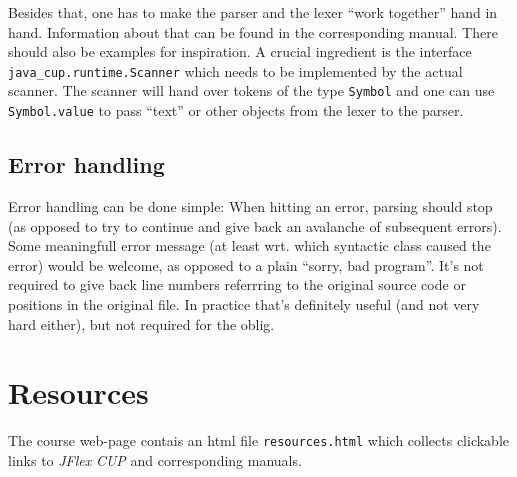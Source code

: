 \documentclass[11pt,freeform]{handout}[2014/08/13]
\begin{document}
Besides that, one has to make the parser and the lexer ``work together''
hand in hand. Information about that can be found in the corresponding
manual. There should also be examples for inspiration. A crucial ingredient
is the interface \texttt{java\_cup.runtime.Scanner} which needs to be
implemented by the actual scanner. The scanner will hand over tokens of the
type \texttt{Symbol} and one can use \texttt{Symbol.value} to pass ``text''
or other objects from the lexer to the parser.



\subsection{Error handling}
\label{sec:error-handling}

Error handling can be done simple: When hitting an error, parsing should
stop (as opposed to try to continue and give back an avalanche of
subsequent errors). Some meaningfull error message (at least wrt. which
syntactic class caused the error) would be welcome, as opposed to a plain
``sorry, bad program''. It's not required to give back line numbers
referrring to the original source code or positions in the original
file. In practice that's definitely useful (and not very hard either), but
not required for the oblig.




\section{Resources}
\label{sec:resources}

The course web-page contais an html file \texttt{resources.html} which
collects clickable links to \textsl{JFlex} \textsl{CUP} and corresponding
manuals.
\end{document}
